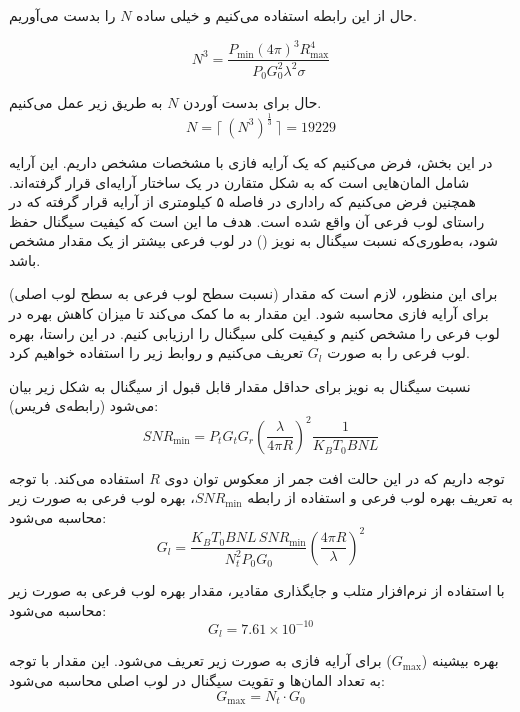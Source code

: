 \documentclass[12pt,onecolumn,a4paper]{article}
\begin{document}
حال از این رابطه استفاده می‌کنیم و خیلی ساده $N$ را بدست می‌آوریم.

\begin{equation}
	 N^3 = \frac{P_{\text{min}}(4 \pi)^3 R_{\text{max}}^4}{ P_0 G_0^2 \lambda^2 \sigma}
\end{equation}

حال برای بدست آوردن $N$ به طریق زیر عمل می‌کنیم.
\begin{equation}
	N = \Big\lceil\ (N^3)^{\tfrac{1}{3}}\ \Big\rceil = 19229
\end{equation}
	
	
	
	
	
	

		

		
		در این بخش، فرض می‌کنیم که یک آرایه فازی با مشخصات مشخص داریم. این آرایه شامل المان‌هایی است که به شکل متقارن در یک ساختار آرایه‌ای قرار گرفته‌اند. همچنین فرض می‌کنیم که راداری در فاصله ۵ کیلومتری از آرایه قرار گرفته که در راستای لوب فرعی آن واقع شده است. هدف ما این است که کیفیت سیگنال حفظ شود، به‌طوری‌که نسبت سیگنال به نویز () در لوب فرعی بیشتر از یک مقدار مشخص باشد.
		
		برای این منظور، لازم است که مقدار  (نسبت سطح لوب فرعی به سطح لوب اصلی) برای آرایه فازی محاسبه شود. این مقدار به ما کمک می‌کند تا میزان کاهش بهره در لوب فرعی را مشخص کنیم و کیفیت کلی سیگنال را ارزیابی کنیم. در این راستا، بهره لوب فرعی را به صورت \( G_l \) تعریف می‌کنیم و روابط زیر را استفاده خواهیم کرد.
		

		نسبت سیگنال به نویز برای حداقل مقدار قابل قبول از سیگنال به شکل زیر بیان می‌شود (رابطه‌ی فریس):
		\[
		SNR_{\text{min}} = P_t G_t G_r \left( \frac{\lambda}{4 \pi R} \right)^2 \frac{1}{K_B T_0 B N L}
		\]


		توجه داریم که در این حالت افت جمر از معکوس توان دوی $R$ استفاده می‌کند.
		با توجه به تعریف بهره لوب فرعی و استفاده از رابطه \( SNR_{\text{min}} \)، بهره لوب فرعی به صورت زیر محاسبه می‌شود:
		\[
		G_l = \frac{K_B T_0 B N L \, SNR_{\text{min}}}{N_t^2 P_0 G_0} \left( \frac{4 \pi R}{\lambda} \right)^2
		\]
		
		
		با استفاده از نرم‌افزار متلب و جایگذاری مقادیر، مقدار بهره لوب فرعی به صورت زیر محاسبه می‌شود:
		\[
		G_l = 7.61 \times 10^{-10}
		\]
		

		
		بهره بیشینه (\( G_{\text{max}} \)) برای آرایه فازی به صورت زیر تعریف می‌شود. این مقدار با توجه به تعداد المان‌ها و تقویت سیگنال در لوب اصلی محاسبه می‌شود:
		\[
		G_{\text{max}} = N_t \cdot G_0
		\]
		
\end{document}

